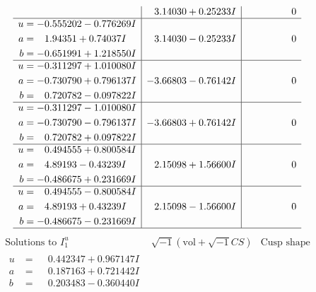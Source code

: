 \documentclass[1p]{elsarticle_modified}
\theoremstyle{definition}
\newcommand{\I}{\sqrt{-1}}
\begin{document}
$$\begin{array}{c|c|c}
 & \phantom{-}3.14030 + 0.25233 I & \phantom{-0.000000 } 0 \\ \hline\begin{aligned}
u &= -0.555202 - 0.776269 I \\
a &= \phantom{-}1.94351 + 0.74037 I \\
b &= -0.651991 + 1.218550 I\end{aligned}
 & \phantom{-}3.14030 - 0.25233 I & \phantom{-0.000000 } 0 \\ \hline\begin{aligned}
u &= -0.311297 + 1.010080 I \\
a &= -0.730790 + 0.796137 I \\
b &= \phantom{-}0.720782 - 0.097822 I\end{aligned}
 & -3.66803 - 0.76142 I & \phantom{-0.000000 } 0 \\ \hline\begin{aligned}
u &= -0.311297 - 1.010080 I \\
a &= -0.730790 - 0.796137 I \\
b &= \phantom{-}0.720782 + 0.097822 I\end{aligned}
 & -3.66803 + 0.76142 I & \phantom{-0.000000 } 0 \\ \hline\begin{aligned}
u &= \phantom{-}0.494555 + 0.800584 I \\
a &= \phantom{-}4.89193 - 0.43239 I \\
b &= -0.486675 + 0.231669 I\end{aligned}
 & \phantom{-}2.15098 + 1.56600 I & \phantom{-0.000000 } 0 \\ \hline\begin{aligned}
u &= \phantom{-}0.494555 - 0.800584 I \\
a &= \phantom{-}4.89193 + 0.43239 I \\
b &= -0.486675 - 0.231669 I\end{aligned}
 & \phantom{-}2.15098 - 1.56600 I & \phantom{-0.000000 } 0\\
 \hline 
 \end{array}$$\newpage$$\begin{array}{c|c|c}  
\text{Solutions to }I^u_{1}& \I (\text{vol} + \sqrt{-1}CS) & \text{Cusp shape}\\
 \hline 
\begin{aligned}
u &= \phantom{-}0.442347 + 0.967147 I \\
a &= \phantom{-}0.187163 + 0.721442 I \\
b &= \phantom{-}0.203483 - 0.360440 I\end{aligned}

\end{array}$$
\end{document}
